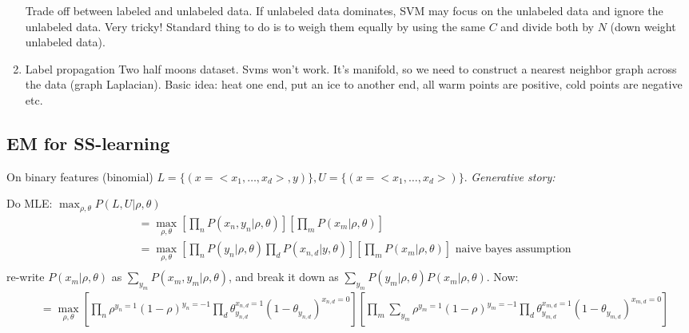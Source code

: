 \begin{enumerate}
Trade off between labeled and unlabeled data. If unlabeled data
dominates, SVM may focus on the unlabeled data and ignore the
unlabeled data. Very tricky! Standard thing to do is to weigh them
equally by using the same $C$ and divide both by $N$ (down weight
unlabeled data).
\item Label propagation
Two half moons dataset. Svms won't work. It's manifold, so we need to
construct a nearest neighbor graph across the data (graph Laplacian). Basic idea: heat one end, put an ice
to another end, all warm points are positive, cold points are negative
etc.

\end{enumerate}

\subsection{EM for SS-learning}
On binary features (binomial)
$L=\{(x=<x_1, \dots, x_d>, y)\}, U=\{(x=<x_1, \dots, x_d>)\}$.
\emph{Generative story:}
\begin{algorithmic}
  \ENDFOR
\ENDFOR
{}
    \ENDFOR
\ENDFOR
\end{algorithmic}

Do MLE: $\max_{\rho, \theta} P(L,U| \rho, \theta)$
\begin{align*}
 &= \max_{\rho,\theta} [ \prod_n P(x_n, y_n|\rho, \theta)][ \prod_m
 P(x_m|\rho, \theta)]\\
 &= \max_{\rho,\theta} [ \prod_n P(y_n|\rho, \theta)\prod_d P(x_{n,d}
 | y, \theta)][ \prod_m P(x_m|\rho, \theta)]\text{ naive bayes
   assumption}\\
\end{align*}
re-write $P(x_m|\rho, \theta)$ as $\sum_{y_m}P(x_m, y_m|\rho,
\theta)$, and break it down as
$\sum_{y_m}P(y_m|\rho,\theta)P(x_m|\rho,\theta)$.
Now:
\begin{align*}
  &=\max_{\rho, \theta} [\prod_n \rho^{y_n=1}(1-\rho)^{y_n=-1}\prod_d
  \theta_{y_{n,d}}^{x_{n,d}=1}(1-\theta_{y_{n,d}})^{x_{n,d}=0}]
[\prod_m \sum_{y_m} \rho^{y_m=1}(1-\rho)^{y_m=-1} \prod_d  \theta_{y_{m,d}}^{x_{m,d}=1}(1-\theta_{y_{m,d}})^{x_{m,d}=0} ]
\end{align*}

